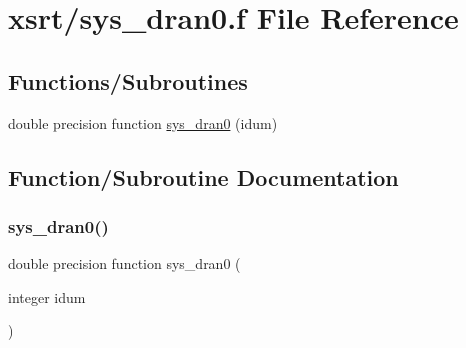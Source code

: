 \hypertarget{sys__dran0_8f}{}\section{xsrt/sys\+\_\+dran0.f File Reference}
\label{sys__dran0_8f}
\subsection*{Functions/\+Subroutines}
\begin{DoxyCompactItemize}
\item 
double precision function \hyperlink{sys__dran0_8f_ac519888dde3a632a13fc957723001b8b}{sys\+\_\+dran0} (idum)
\end{DoxyCompactItemize}


\subsection{Function/\+Subroutine Documentation}
\mbox{\label{sys__dran0_8f_ac519888dde3a632a13fc957723001b8b}} 
\subsubsection{\texorpdfstring{sys\+\_\+dran0()}{sys\_dran0()}}
{\footnotesize\ttfamily double precision function sys\+\_\+dran0 (\begin{DoxyParamCaption}\item[{integer}]{idum }\end{DoxyParamCaption})}


